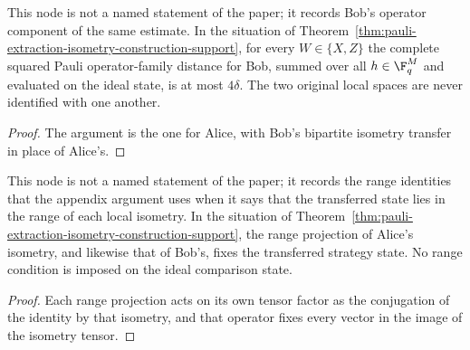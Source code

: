 \begin{theorem}
  \label{thm:pauli-extraction-bob-distance-support}
  \leanok
  This node is not a named statement of the paper; it records Bob's operator
  component of the same estimate. In the situation of
  Theorem~\ref{thm:pauli-extraction-isometry-construction-support}, for every
  $W\in\{X,Z\}$ the complete squared Pauli operator-family distance for Bob,
  summed over all $h\in\F_q^M$ and evaluated on the ideal state, is at most
  $4\delta$. The two original local spaces are never identified with one
  another.
\end{theorem}
\begin{proof}
  \leanok
  The argument is the one for Alice, with Bob's bipartite isometry transfer in
  place of Alice's.
\end{proof}

\begin{theorem}
  \label{thm:pauli-extraction-transferred-range-support}
  \leanok
  This node is not a named statement of the paper; it records the range
  identities that the appendix argument uses when it says that the transferred
  state lies in the range of each local isometry. In the situation of
  Theorem~\ref{thm:pauli-extraction-isometry-construction-support}, the range
  projection of Alice's isometry, and likewise that of Bob's, fixes the
  transferred strategy state. No range condition is imposed on the ideal
  comparison state.
\end{theorem}
\begin{proof}
  \leanok
  Each range projection acts on its own tensor factor as the conjugation of
  the identity by that isometry, and that operator fixes every vector in the
  image of the isometry tensor.
\end{proof}

